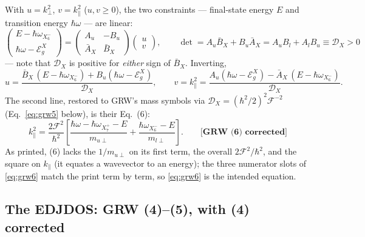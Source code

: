 \documentclass[11pt,a4paper]{article}
\numberwithin{equation}{section}
\newcommand{\hw}{\hbar\omega}
\newcommand{\EgX}{\mathcal{E}_g^{X}}
\newcommand{\cD}{\mathcal{D}}
\newcommand{\cF}{\mathcal{F}}
\newcommand{\AX}{\bar{A}_X}
\newcommand{\BX}{\bar{B}_X}
\newcommand{\kperp}{k_{\perp}}
\newcommand{\kpar}{k_{\parallel}}
\newcommand{\wXsix}{\hbar\omega_{X_6^-}}
\newcommand{\wXseven}{\hbar\omega_{X_7^+}}
\newcommand{\grwfix}[1]{\textbf{[GRW~(#1) corrected]}}
\begin{document}
With $u=\kperp^2$, $v=\kpar^2$ ($u,v\ge0$), the two constraints
--- final-state energy $E$ and transition energy $\hw$ --- are linear:
\begin{equation}
\begin{pmatrix} E-\wXsix\\[2pt] \hw-\EgX\end{pmatrix}
=\begin{pmatrix} A_u & -B_u\\[2pt] \AX & \BX\end{pmatrix}
\begin{pmatrix} u\\ v\end{pmatrix},
\qquad
\det=A_u\BX+B_u\AX=A_uB_l+A_lB_u\equiv\cD_X>0
\label{eq:linX}
\end{equation}
--- note that $\cD_X$ is positive for \emph{either} sign of $\BX$.
Inverting,
\begin{equation}
u=\frac{\BX\,(E-\wXsix)+B_u(\hw-\EgX)}{\cD_X},
\qquad
v=\kpar^2=\frac{A_u(\hw-\EgX)-\AX\,(E-\wXsix)}{\cD_X}.
\label{eq:uvX}
\end{equation}
The second line, restored to GRW's mass symbols via
$\cD_X=(\hbar^2/2)^2\cF^{-2}$ (Eq.~\eqref{eq:grw5} below), is their
Eq.~(6):
\begin{equation}
\kpar^{2}
=\frac{2\cF^{2}}{\hbar^{2}}\left[
\frac{\hw-\wXseven-E}{m_{u\perp}}
+\frac{\wXsix-E}{m_{l\perp}}\right].
\qquad\grwfix{6}
\label{eq:grw6}
\end{equation}
As printed, (6) lacks the $1/m_{u\perp}$ on its first term, the
overall $2\cF^2/\hbar^2$, and the square on $\kpar$ (it equates a
wavevector to an energy); the three numerator slots of
\eqref{eq:grw6} match the print term by term, so \eqref{eq:grw6} is
the intended equation.

\subsection{The EDJDOS: GRW (4)--(5), with (4) corrected}
\end{document}
